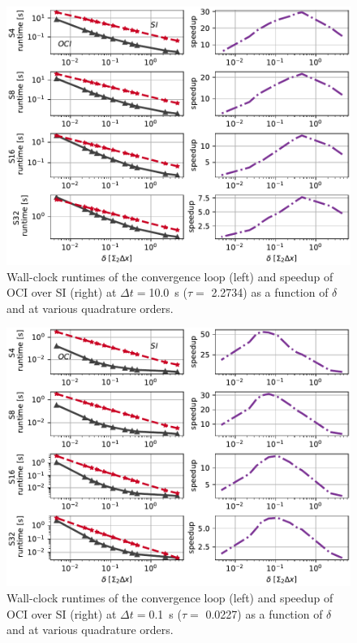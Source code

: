 \begin{figure}
    \centering
    \includegraphics[width=1.0\textwidth]{figures/therefore_figs/runtimes_10.0.pdf}
    \caption{Wall-clock runtimes of the convergence loop (left) and 
    speedup of OCI over SI (right) at $\Delta t=$\SI{10.0}{\s} ($\tau=$ \num{2.2734}) as a function of $\delta$ and at various quadrature orders.}
    \label{fig:runtimes10.0}
\end{figure}

\begin{figure}
    \centering
    \includegraphics[width=1.0\textwidth]{figures/therefore_figs/runtimes_0.1.pdf}
    \caption{Wall-clock runtimes of the convergence loop (left) and 
    speedup of OCI over SI (right) at $\Delta t=$\SI{0.1}{\s} ($\tau=$ \num{0.0227}) as a function of $\delta$ and at various quadrature orders.}
    \label{fig:runtimes0.1}
\end{figure}

